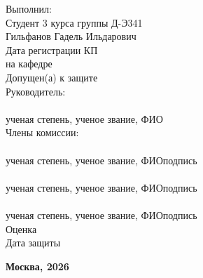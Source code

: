 \documentclass[14pt,a4paper]{extreport}
\begin{document}
\begin{titlepage}
\vspace{3pt}

\hfill
\begin{minipage}{82mm}
  \setlength{\baselineskip}{7pt}
  Выполнил:\\
  Студент 3 курса группы Д-Э341\\
  Гильфанов Гадель Ильдарович\\[4pt]
  Дата регистрации КП\\
  на кафедре \underline{\hspace{28mm}}\\[10pt]
  Допущен(а) к защите\\[10pt]
  Руководитель:\\[2pt]
  \underline{\hspace{82mm}}\\[0pt]
  {\fontsize{7}{9}\selectfont\hspace{2mm}ученая степень, ученое звание, ФИО}\\[14pt]
  \hspace{20mm}Члены комиссии:\\[6pt]
  \underline{\hspace{52mm}}\quad\underline{\hspace{18mm}}\\[0pt]
  {\fontsize{7}{9}\selectfont ученая степень, ученое звание, ФИО\hfill подпись}\\[7pt]
  \underline{\hspace{52mm}}\quad\underline{\hspace{18mm}}\\[0pt]
  {\fontsize{7}{9}\selectfont ученая степень, ученое звание, ФИО\hfill подпись}\\[7pt]
  \underline{\hspace{52mm}}\quad\underline{\hspace{18mm}}\\[0pt]
  {\fontsize{7}{9}\selectfont ученая степень, ученое звание, ФИО\hfill подпись}\\[12pt]
  Оценка \underline{\hspace{42mm}}\\[8pt]
  Дата защиты \underline{\hspace{36mm}}
\end{minipage}

\vfill
\begin{center}
  {\normalsize\textbf{Москва, 2026}}
\end{center}

\end{titlepage}
\end{document}
